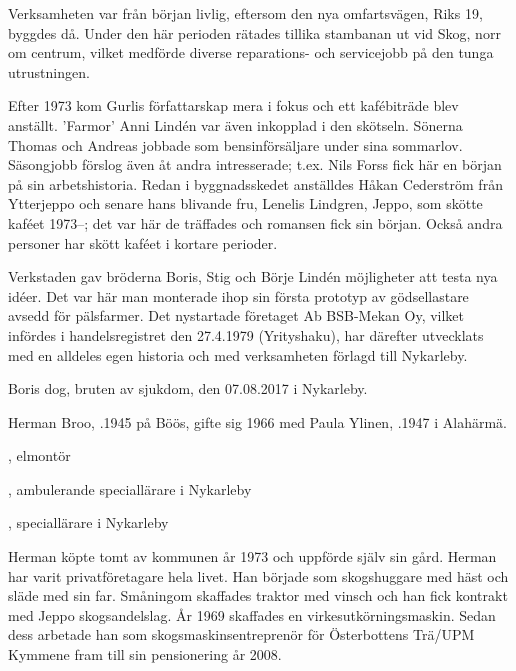 

Verksamheten var från början livlig, eftersom den nya omfartsvägen, Riks 19, byggdes då. Under den här perioden rätades tillika stambanan ut vid Skog, norr om centrum, vilket medförde diverse reparations- och servicejobb på den tunga utrustningen.

Efter 1973 kom Gurlis författarskap mera i fokus och ett kafébiträde blev anställt. 'Farmor' Anni Lindén var även inkopplad i den skötseln. Sönerna Thomas och Andreas jobbade som bensinförsäljare under sina sommarlov. Säsongjobb förslog även åt andra intresserade; t.ex. Nils Forss fick här en början på sin arbetshistoria. Redan i byggnadsskedet anställdes Håkan Cederström från Ytterjeppo och senare hans blivande fru, Lenelis Lindgren, Jeppo, som skötte kaféet 1973--; det var här de träffades och romansen fick sin början.	Också andra personer har skött kaféet i kortare perioder.

Verkstaden gav bröderna Boris, Stig och Börje Lindén möjligheter att testa nya idéer. Det var här man monterade ihop sin första prototyp	av gödsellastare avsedd för pälsfarmer. Det nystartade företaget Ab	BSB-Mekan Oy, vilket infördes i handelsregistret den 27.4.1979 (Yrityshaku), har därefter utvecklats med en alldeles egen historia och med verksamheten förlagd till Nykarleby.

Boris dog, bruten av sjukdom, den 07.08.2017 i Nykarleby.






Herman Broo, .1945 på Böös, gifte sig 1966 med Paula Ylinen, .1947 i Alahärmä.
\begin{jhchildren}
  \item {}, elmontör
  \item {}, ambulerande speciallärare i Nykarleby
  \item {}, speciallärare i Nykarleby
\end{jhchildren}

Herman köpte tomt av kommunen år 1973 och uppförde själv sin gård. Herman har varit privatföretagare hela livet. Han började som skogshuggare med häst och släde med sin far. Småningom skaffades traktor med vinsch och han fick kontrakt med Jeppo skogsandelslag. År 1969 skaffades en virkesutkörningsmaskin. Sedan dess arbetade han som skogsmaskinsentreprenör för Österbottens Trä/UPM Kymmene fram till sin pensionering år 2008.

